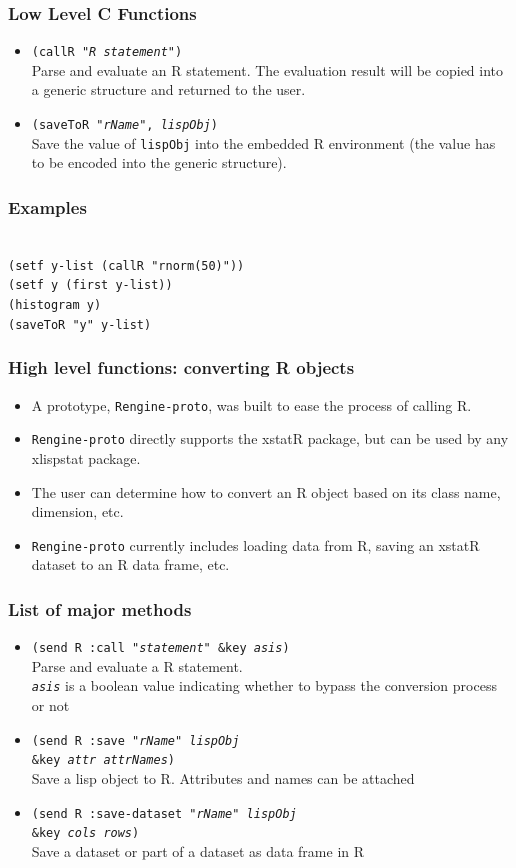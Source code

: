 \documentclass{beamer}
\begin{document}
\begin{frame}
\frametitle{Low Level C Functions}
\begin{itemize}
	\item \texttt{(callR "\emph{R statement}")}\\
	Parse and evaluate an R statement. The evaluation result will be copied into a generic structure and returned to the user.
	\item \texttt{(saveToR "\emph{rName}", \emph{lispObj})}\\
	Save the value of \texttt{lispObj} into the embedded R environment (the value has to be encoded into the 	generic structure).
\end{itemize}
\end{frame}

\begin{frame}
\frametitle{Examples}
\texttt{
\\
(setf y-list (callR "rnorm(50)")) \\
(setf y (first y-list)) \\
(histogram y) \\
(saveToR "y" y-list)
}
\end{frame}

\begin{frame}
\frametitle{High level functions: converting R objects}
\begin{itemize}
	\item A prototype, \texttt{Rengine-proto}, was built to ease the process of calling R.
	\item  \texttt{Rengine-proto} directly supports the xstatR package, but can be used by any xlispstat package.
	\item The user can determine how to convert an R object based on its class name, dimension, etc. 
	\item  \texttt{Rengine-proto} currently includes loading data from R, saving an xstatR dataset to an R data frame, etc.
\end{itemize}
\end{frame}

\begin{frame}
\frametitle{List of major methods}
\begin{itemize}
	\item \texttt{(send R :call \emph{"statement"} \&key \emph{asis})}\\
	Parse and evaluate a R statement.\\
	\texttt{\emph{asis}} is a boolean value indicating whether to bypass the conversion process or not
	\item \texttt{(send R :save \emph{"rName"} \emph{lispObj}\\ 
	\&key \emph{attr attrNames})}\\
	Save a lisp object to R. Attributes and names can be attached
	\item \texttt{(send R :save-dataset \emph{"rName"} \emph{lispObj}\\ 
	\&key \emph{cols rows})}\\
	Save a dataset or part of a dataset as data frame in R
\end{itemize}
\end{frame}
\end{document}
